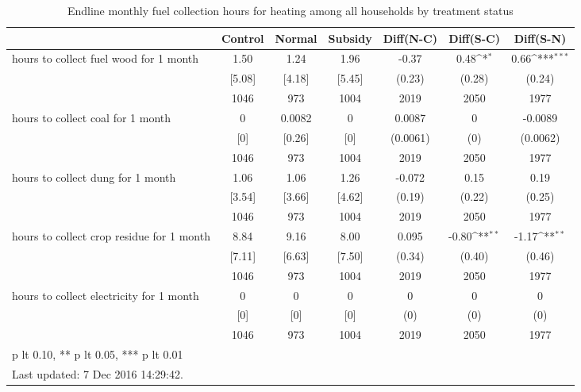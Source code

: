 \begin{table}[htbp]\centering
\def\sym#1{\ifmmode^{#1}\else\(^{#1}\)\fi}
\caption{Endline monthly fuel collection hours for heating among all households by treatment status \label{tab:"balance"}}
\begin{tabular*}{1\hsize}{@{\hskip\tabcolsep\extracolsep\fill}l*{1}{cccccc}}
\toprule
                                &  Control&   Normal&  Subsidy&Diff(N-C)         &Diff(S-C)         &Diff(S-N)         \\
\midrule
hours to collect fuel wood for 1 month&     1.50&     1.24&     1.96&    -0.37         &     0.48\sym{*}  &     0.66\sym{***}\\
                                &   [5.08]&   [4.18]&   [5.45]&   (0.23)         &   (0.28)         &   (0.24)         \\
                                &     1046&      973&     1004&     2019         &     2050         &     1977         \\
hours to collect coal for 1 month&        0&   0.0082&        0&   0.0087         &        0         &  -0.0089         \\
                                &      [0]&   [0.26]&      [0]& (0.0061)         &      (0)         & (0.0062)         \\
                                &     1046&      973&     1004&     2019         &     2050         &     1977         \\
hours to collect dung for 1 month&     1.06&     1.06&     1.26&   -0.072         &     0.15         &     0.19         \\
                                &   [3.54]&   [3.66]&   [4.62]&   (0.19)         &   (0.22)         &   (0.25)         \\
                                &     1046&      973&     1004&     2019         &     2050         &     1977         \\
hours to collect crop residue for 1 month&     8.84&     9.16&     8.00&    0.095         &    -0.80\sym{**} &    -1.17\sym{**} \\
                                &   [7.11]&   [6.63]&   [7.50]&   (0.34)         &   (0.40)         &   (0.46)         \\
                                &     1046&      973&     1004&     2019         &     2050         &     1977         \\
hours to collect electricity for 1 month&        0&        0&        0&        0         &        0         &        0         \\
                                &      [0]&      [0]&      [0]&      (0)         &      (0)         &      (0)         \\
                                &     1046&      973&     1004&     2019         &     2050         &     1977         \\
\bottomrule
\multicolumn{7}{l}{\footnotesize * p lt 0.10, ** p lt 0.05, *** p lt 0.01}\\
\multicolumn{7}{l}{\footnotesize Last updated:  7 Dec 2016 14:29:42.}\\
\end{tabular*}
\end{table}
